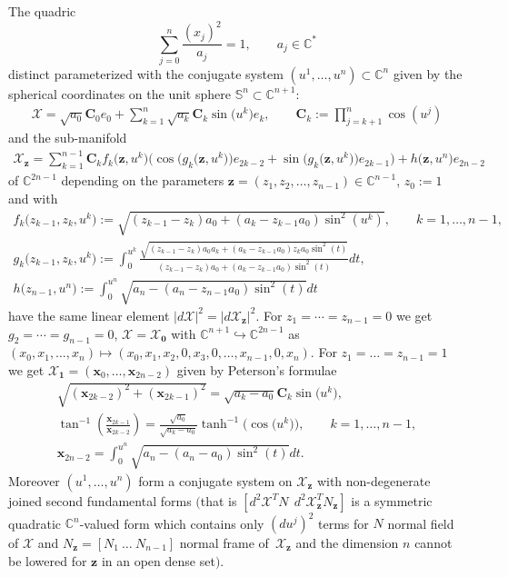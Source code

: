 \begin{theorem}\label{theorem1}
The quadric
\[
\sum_{j=0}^n\frac{(x_j)^2}{a_j}=1,\qquad
a_j\in\mathbb{C}^*
\] distinct parameterized with the conjugate
system $(u^1,\dots ,u^n)\subset\mathbb{C}^n$ given by the spherical
coordinates on the unit sphere
$\mathbb{S}^n\subset\mathbb{C}^{n+1}$:
\begin{gather*}
\mathcal{X}=\sqrt{a_0}\mathbf{C}_0e_0+
\sum_{k=1}^n\sqrt{a_k}\mathbf{C}_k\sin\big(u^k\big)e_k,\qquad
\mathbf{C}_k:=\prod_{j=k+1}^n\cos(u^j)
\end{gather*}
and the sub-manifold
\begin{gather*}
\mathcal{X}_{\mathbf{z}}=\sum_{k=1}^{n-1}\mathbf{C}_kf_k\big(\mathbf{z},u^k\big)
\big(\cos\big(g_k\big(\mathbf{z},u^k\big)\big)e_{2k-2}
+\sin\big(g_k\big(\mathbf{z},u^k\big)\big)e_{2k-1}\big)+h\big(\mathbf{z},u^n\big)e_{2n-2}
\end{gather*}
 of
$\mathbb{C}^{2n-1}$ depending on the parameters
$\mathbf{z}=(z_1,z_2,\dots ,z_{n-1})\in\mathbb{C}^{n-1}$, $z_0:=1$
and with
\begin{gather}
f_k\big(z_{k-1},z_k,u^k\big):=\sqrt{(z_{k-1}-z_k)a_0+(a_k-z_{k-1}a_0)\sin^2(u^k)},\qquad k=1,\dots ,n-1,\nonumber\\
g_k\big(z_{k-1},z_k,u^k\big):=\int_0^{u^k}\frac{\sqrt{(z_{k-1}-z_k)a_0a_k+(a_k-z_{k-1}a_0)z_ka_0\sin^2(t)}}
{(z_{k-1}-z_k)a_0+(a_k-z_{k-1}a_0)\sin^2(t)}dt,\nonumber\\
h\big(z_{n-1},u^n\big):=\int_0^{u^n}\sqrt{a_n-(a_n-z_{n-1}a_0)\sin^2(t)}dt\label{eq:fgn}
\end{gather}
have the same linear element
$|d\mathcal{X}|^2{=}|d\mathcal{X}_{\mathbf{z}}|^2$. For
$z_1={\cdots}=z_{n-1}=0$ we get \mbox{$g_2={\cdots}=g_{n-1}=0$},
$\mathcal{X}=\mathcal{X}_{\mathbf{0}}$ with
$\mathbb{C}^{n+1}\hookrightarrow\mathbb{C}^{2n-1}$ as
$(x_0,x_1,\dots ,x_n)\mapsto(x_0,x_1,x_2,0,x_3,0,\dots ,x_{n-1},0,x_n)$.
For $z_1=\dots =z_{n-1}=1$ we get
$\mathcal{X}_{\mathbf{1}}=(\mathbf{x}_0,\dots ,\mathbf{x}_{2n-2})$
given by Peterson's formulae
\begin{gather}
\sqrt{(\mathbf{x}_{2k-2})^2+(\mathbf{x}_{2k-1})^2}=\sqrt{a_k-a_0}\mathbf{C}_k\sin\big(u^k\big),\nonumber\\
 \tan^{-1}\left(\frac{\mathbf{x}_{2k-1}}{\mathbf{x}_{2k-2}}\right)
=\frac{\sqrt{a_0}}{\sqrt{a_k-a_0}}\tanh^{-1}\big(\cos\big(u^k\big)\big), \qquad k=1,\dots,n-1,
\nonumber\\
\mathbf{x}_{2n-2}=\int_0^{u^n}\sqrt{a_n-(a_n-a_0)\sin^2(t)}dt.\label{eq:pfn}
\end{gather}
Moreover $(u^1,\dots ,u^n)$ form a conjugate system on
$\mathcal{X}_{\mathbf{z}}$ with non-degenerate joined second
fundamental forms $($that is $[d^2\mathcal{X}^TN\ \
d^2\mathcal{X}_{\mathbf{z}}^TN_{\mathbf{z}}]$ is a symmetric
quadratic $\mathbb{C}^n$-valued form which contains only
$(du^j)^2$ terms for $N$ normal field of $\mathcal{X}$ and
$N_{\mathbf{z}}=[N_1\   \dots   \ N_{n-1}]$ normal frame of~$\mathcal{X}_{\mathbf{z}}$ and the dimension $n$ cannot be lowered
for $\mathbf{z}$ in an open dense set$)$.
\end{theorem}
